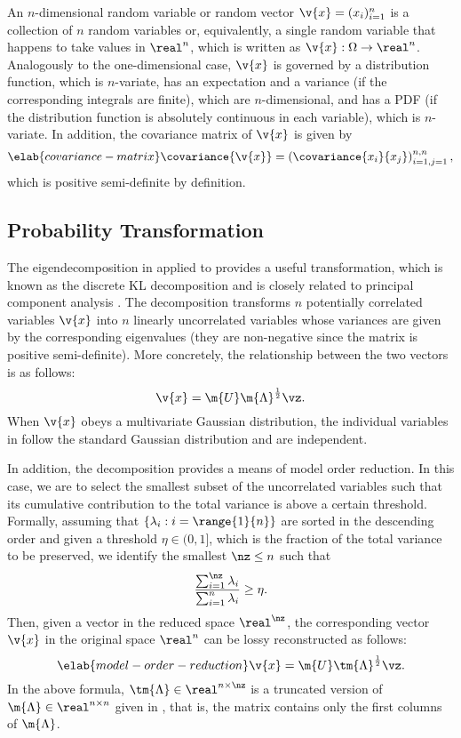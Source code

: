 An $n$-dimensional random variable or random vector $\v{x} = (x_i)_{i = 1}^n$ is
a collection of $n$ random variables or, equivalently, a single random variable
that happens to take values in $\real^n$, which is written as $\v{x}: \Omega \to
\real^n$. Analogously to the one-dimensional case, $\v{x}$ is governed by a
distribution function, which is $n$-variate, has an expectation and a variance
(if the corresponding integrals are finite), which are $n$-dimensional, and has
a \ac{PDF} (if the distribution function is absolutely continuous in each
variable), which is $n$-variate. In addition, the covariance matrix of $\v{x}$
is given by
\begin{equation} \elab{covariance-matrix}
  \covariance{\v{x}} = \left(\covariance{x_i}{x_j}\right)_{i = 1, j = 1}^{n, n},
\end{equation}
which is positive semi-definite by definition.

\subsection{Probability Transformation}

The eigendecomposition in  applied to
 provides a useful transformation, which is known as the
discrete \ac{KL} decomposition \cite{ghanem1991, xiu2010} and is closely related
to principal component analysis \cite{hastie2013}. The decomposition transforms
$n$ potentially correlated variables $\v{x}$ into $n$ linearly uncorrelated
variables \vz whose variances are given by the corresponding eigenvalues (they
are non-negative since the matrix is positive semi-definite). More concretely,
the relationship between the two vectors is as follows:
\[
  \v{x} = \m{U} \m{\Lambda}^\frac{1}{2} \vz.
\]
When $\v{x}$ obeys a multivariate Gaussian distribution, the individual
variables in \vz follow the standard Gaussian distribution and are independent.

In addition, the decomposition provides a means of model order reduction. In
this case, we are to select the smallest subset of the uncorrelated variables
such that its cumulative contribution to the total variance is above a certain
threshold. Formally, assuming that $\{ \lambda_i: i = \range{1}{n} \}$ are
sorted in the descending order and given a threshold $\eta \in (0, 1]$, which is
the fraction of the total variance to be preserved, we identify the smallest
$\nz \leq n$ such that
\[
  \frac{\sum_{i = 1}^\nz \lambda_i}{\sum_{i = 1}^n \lambda_i} \geq \eta.
\]
Then, given a vector \vz in the reduced space $\real^\nz$, the corresponding
vector $\v{x}$ in the original space $\real^n$ can be lossy reconstructed as
follows:
\begin{equation} \elab{model-order-reduction}
  \v{x} = \m{U} \tm{\Lambda}^\frac{1}{2} \vz.
\end{equation}
In the above formula, $\tm{\Lambda} \in \real^{n \times \nz}$ is a truncated
version of $\m{\Lambda} \in \real^{n \times n}$ given in
, that is, the matrix contains only the first \nz
columns of $\m{\Lambda}$.

